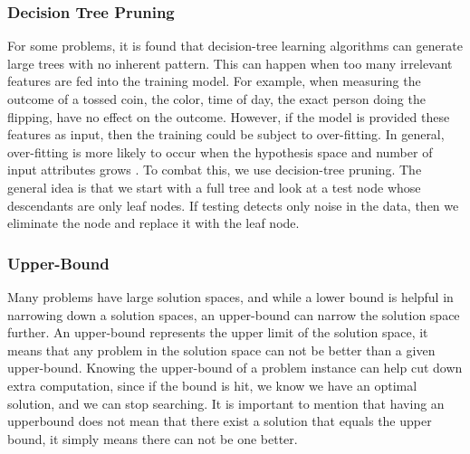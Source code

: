 	\subsubsection{Decision Tree Pruning}
		For some problems, it is found that decision-tree learning algorithms can generate large trees with no inherent pattern. This can happen when too many irrelevant features are fed into the training model. 
		For example, when measuring the outcome of a tossed coin, the color, time of day, the exact person doing the flipping, have no effect on the outcome. 
		However, if the model is provided these features as input, then the training could be subject to over-fitting. 
		In general, over-fitting is more likely to occur when the hypothesis space and number of input attributes grows \cite{russell2010artificial}. 
		To combat this, we use decision-tree pruning. 
		The general idea is that we start with a full tree and look at a test node whose descendants are only leaf nodes. 
		If testing detects only noise in the data, then we eliminate the node and replace it with the leaf node.
	\subsubsection{Upper-Bound}
		Many problems have large solution spaces, and while a lower bound is helpful in narrowing
		down a solution spaces, an upper-bound can narrow the solution space further.
		An upper-bound represents the upper limit of the solution space, it means that any
		problem in the solution space can not be better than a given upper-bound.
		Knowing the upper-bound of a problem instance can help cut down extra computation,
		since if the bound is hit, we know we have an optimal solution, and we can stop
		searching. It is important to mention that having an upperbound does not 
		mean that there exist a solution that equals the upper bound, it simply means 
		there can not be one better.
